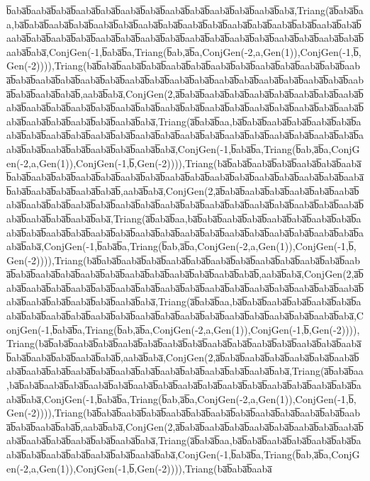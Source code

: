 b̅aba̅b̅aaba̅b̅aba̅b̅aaba̅b̅aba̅b̅aaba̅b̅aba̅b̅aaba̅b̅aba̅b̅aaba̅b̅aba̅b̅aaba̅b̅aba̅,Triang(a̅b̅aba̅b̅aa,ba̅b̅aba̅b̅aaba̅b̅aba̅b̅aaba̅b̅aba̅b̅aaba̅b̅aba̅b̅aaba̅b̅aba̅b̅aaba̅b̅aba̅b̅aaba̅b̅aba̅b̅aaba̅b̅aba̅b̅aaba̅b̅aba̅b̅aaba̅b̅aba̅b̅aaba̅b̅aba̅b̅aaba̅b̅aba̅b̅aaba̅b̅aba̅b̅aaba̅b̅aba̅b̅aaba̅b̅aba̅b̅aaba̅b̅aba̅b̅aaba̅b̅aba̅,ConjGen(-1,b̅aba̅b̅a,Triang(b̅ab,a̅b̅a,ConjGen(-2,a,Gen(1)),ConjGen(-1,b̅,Gen(-2)))),Triang(ba̅b̅aba̅b̅aaba̅b̅aba̅b̅aaba̅b̅aba̅b̅aaba̅b̅aba̅b̅aaba̅b̅aba̅b̅aaba̅b̅aba̅b̅aaba̅b̅aba̅b̅aaba̅b̅aba̅b̅aaba̅b̅aba̅b̅aaba̅b̅aba̅b̅aaba̅b̅aba̅b̅aaba̅b̅aba̅b̅aaba̅b̅aba̅b̅aaba̅b̅aba̅b̅aaba̅b̅aba̅b̅aaba̅b̅aba̅b̅,aaba̅b̅aba̅,ConjGen(2,a̅b̅aba̅b̅aaba̅b̅aba̅b̅aaba̅b̅aba̅b̅aaba̅b̅aba̅b̅aaba̅b̅aba̅b̅aaba̅b̅aba̅b̅aaba̅b̅aba̅b̅aaba̅b̅aba̅b̅aaba̅b̅aba̅b̅aaba̅b̅aba̅b̅aaba̅b̅aba̅b̅aaba̅b̅aba̅b̅aaba̅b̅aba̅b̅aaba̅b̅aba̅b̅aaba̅b̅aba̅b̅aaba̅b̅aba̅,Triang(a̅b̅aba̅b̅aa,ba̅b̅aba̅b̅aaba̅b̅aba̅b̅aaba̅b̅aba̅b̅aaba̅b̅aba̅b̅aaba̅b̅aba̅b̅aaba̅b̅aba̅b̅aaba̅b̅aba̅b̅aaba̅b̅aba̅b̅aaba̅b̅aba̅b̅aaba̅b̅aba̅b̅aaba̅b̅aba̅b̅aaba̅b̅aba̅b̅aaba̅b̅aba̅b̅aaba̅b̅aba̅b̅aaba̅b̅aba̅,ConjGen(-1,b̅aba̅b̅a,Triang(b̅ab,a̅b̅a,ConjGen(-2,a,Gen(1)),ConjGen(-1,b̅,Gen(-2)))),Triang(ba̅b̅aba̅b̅aaba̅b̅aba̅b̅aaba̅b̅aba̅b̅aaba̅b̅aba̅b̅aaba̅b̅aba̅b̅aaba̅b̅aba̅b̅aaba̅b̅aba̅b̅aaba̅b̅aba̅b̅aaba̅b̅aba̅b̅aaba̅b̅aba̅b̅aaba̅b̅aba̅b̅aaba̅b̅aba̅b̅aaba̅b̅aba̅b̅aaba̅b̅aba̅b̅,aaba̅b̅aba̅,ConjGen(2,a̅b̅aba̅b̅aaba̅b̅aba̅b̅aaba̅b̅aba̅b̅aaba̅b̅aba̅b̅aaba̅b̅aba̅b̅aaba̅b̅aba̅b̅aaba̅b̅aba̅b̅aaba̅b̅aba̅b̅aaba̅b̅aba̅b̅aaba̅b̅aba̅b̅aaba̅b̅aba̅b̅aaba̅b̅aba̅b̅aaba̅b̅aba̅b̅aaba̅b̅aba̅,Triang(a̅b̅aba̅b̅aa,ba̅b̅aba̅b̅aaba̅b̅aba̅b̅aaba̅b̅aba̅b̅aaba̅b̅aba̅b̅aaba̅b̅aba̅b̅aaba̅b̅aba̅b̅aaba̅b̅aba̅b̅aaba̅b̅aba̅b̅aaba̅b̅aba̅b̅aaba̅b̅aba̅b̅aaba̅b̅aba̅b̅aaba̅b̅aba̅b̅aaba̅b̅aba̅,ConjGen(-1,b̅aba̅b̅a,Triang(b̅ab,a̅b̅a,ConjGen(-2,a,Gen(1)),ConjGen(-1,b̅,Gen(-2)))),Triang(ba̅b̅aba̅b̅aaba̅b̅aba̅b̅aaba̅b̅aba̅b̅aaba̅b̅aba̅b̅aaba̅b̅aba̅b̅aaba̅b̅aba̅b̅aaba̅b̅aba̅b̅aaba̅b̅aba̅b̅aaba̅b̅aba̅b̅aaba̅b̅aba̅b̅aaba̅b̅aba̅b̅aaba̅b̅aba̅b̅,aaba̅b̅aba̅,ConjGen(2,a̅b̅aba̅b̅aaba̅b̅aba̅b̅aaba̅b̅aba̅b̅aaba̅b̅aba̅b̅aaba̅b̅aba̅b̅aaba̅b̅aba̅b̅aaba̅b̅aba̅b̅aaba̅b̅aba̅b̅aaba̅b̅aba̅b̅aaba̅b̅aba̅b̅aaba̅b̅aba̅b̅aaba̅b̅aba̅,Triang(a̅b̅aba̅b̅aa,ba̅b̅aba̅b̅aaba̅b̅aba̅b̅aaba̅b̅aba̅b̅aaba̅b̅aba̅b̅aaba̅b̅aba̅b̅aaba̅b̅aba̅b̅aaba̅b̅aba̅b̅aaba̅b̅aba̅b̅aaba̅b̅aba̅b̅aaba̅b̅aba̅b̅aaba̅b̅aba̅,ConjGen(-1,b̅aba̅b̅a,Triang(b̅ab,a̅b̅a,ConjGen(-2,a,Gen(1)),ConjGen(-1,b̅,Gen(-2)))),Triang(ba̅b̅aba̅b̅aaba̅b̅aba̅b̅aaba̅b̅aba̅b̅aaba̅b̅aba̅b̅aaba̅b̅aba̅b̅aaba̅b̅aba̅b̅aaba̅b̅aba̅b̅aaba̅b̅aba̅b̅aaba̅b̅aba̅b̅aaba̅b̅aba̅b̅,aaba̅b̅aba̅,ConjGen(2,a̅b̅aba̅b̅aaba̅b̅aba̅b̅aaba̅b̅aba̅b̅aaba̅b̅aba̅b̅aaba̅b̅aba̅b̅aaba̅b̅aba̅b̅aaba̅b̅aba̅b̅aaba̅b̅aba̅b̅aaba̅b̅aba̅b̅aaba̅b̅aba̅,Triang(a̅b̅aba̅b̅aa,ba̅b̅aba̅b̅aaba̅b̅aba̅b̅aaba̅b̅aba̅b̅aaba̅b̅aba̅b̅aaba̅b̅aba̅b̅aaba̅b̅aba̅b̅aaba̅b̅aba̅b̅aaba̅b̅aba̅b̅aaba̅b̅aba̅,ConjGen(-1,b̅aba̅b̅a,Triang(b̅ab,a̅b̅a,ConjGen(-2,a,Gen(1)),ConjGen(-1,b̅,Gen(-2)))),Triang(ba̅b̅aba̅b̅aaba̅b̅aba̅b̅aaba̅b̅aba̅b̅aaba̅b̅aba̅b̅aaba̅b̅aba̅b̅aaba̅b̅aba̅b̅aaba̅b̅aba̅b̅aaba̅b̅aba̅b̅,aaba̅b̅aba̅,ConjGen(2,a̅b̅aba̅b̅aaba̅b̅aba̅b̅aaba̅b̅aba̅b̅aaba̅b̅aba̅b̅aaba̅b̅aba̅b̅aaba̅b̅aba̅b̅aaba̅b̅aba̅b̅aaba̅b̅aba̅,Triang(a̅b̅aba̅b̅aa,ba̅b̅aba̅b̅aaba̅b̅aba̅b̅aaba̅b̅aba̅b̅aaba̅b̅aba̅b̅aaba̅b̅aba̅b̅aaba̅b̅aba̅b̅aaba̅b̅aba̅,ConjGen(-1,b̅aba̅b̅a,Triang(b̅ab,a̅b̅a,ConjGen(-2,a,Gen(1)),ConjGen(-1,b̅,Gen(-2)))),Triang(ba̅b̅aba̅b̅aaba̅